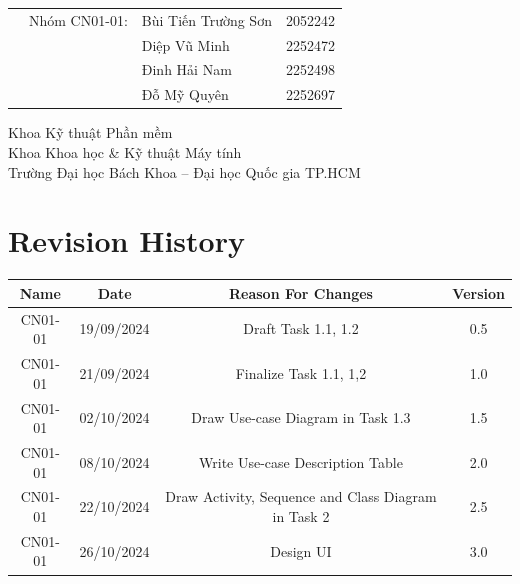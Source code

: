 \begin{titlepage}
\begin{table}[h]
\begin{tabular}{rrll}
			              & Nhóm CN01-01:         & Bùi Tiến Trường Sơn & 2052242 \\
			              &                       & Diệp Vũ Minh        & 2252472 \\
			              &                       & Đinh Hải Nam        & 2252498 \\
			              &                       & Đỗ Mỹ Quyên         & 2252697 \\
		\end{tabular}
	\end{table}

	\vspace{2cm}

	\begin{flushright}
		\begin{minipage}{0.8\textwidth}
			\raggedleft
			\large
			Khoa Kỹ thuật Phần mềm \\
			Khoa Khoa học \& Kỹ thuật Máy tính \\
			Trường Đại học Bách Khoa – Đại học Quốc gia TP.HCM
		\end{minipage}
	\end{flushright}

\end{titlepage}


\newpage
\tableofcontents

\section*{Revision History}

\begin{longtable}{|c|c|c|c|}
	\hline
	\textbf{Name} & \textbf{Date} & \textbf{Reason For Changes}                         & \textbf{Version} \\ \hline\hline
	CN01-01       & 19/09/2024    & Draft Task 1.1, 1.2                                 & 0.5              \\ \hline
	CN01-01       & 21/09/2024    & Finalize Task 1.1, 1,2                              & 1.0              \\ \hline
	CN01-01       & 02/10/2024    & Draw Use-case Diagram in Task 1.3                   & 1.5              \\ \hline
	CN01-01       & 08/10/2024    & Write Use-case Description Table                    & 2.0              \\ \hline
	CN01-01       & 22/10/2024    & Draw Activity, Sequence and Class Diagram in Task 2 & 2.5              \\ \hline
	CN01-01       & 26/10/2024    & Design UI                                           & 3.0              \\ \hline
\end{longtable}

